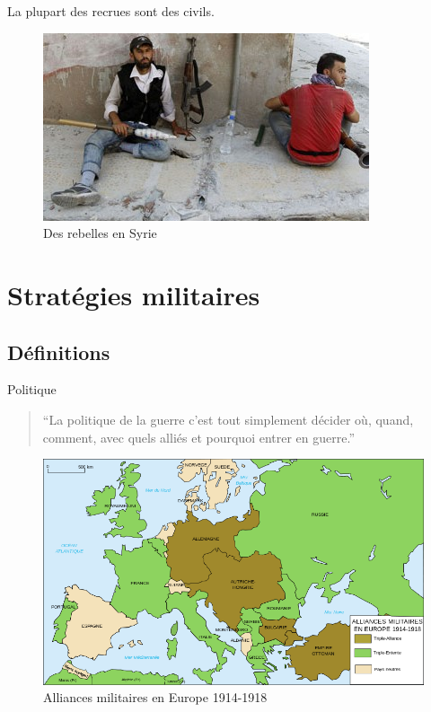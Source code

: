 \documentclass{article}
\begin{document}
La plupart des recrues sont des civils.
\begin{figure}[H]
	\begin{centering}
	\includegraphics[]{../ressources/rebel_syrie}
	\caption{Des rebelles en Syrie \cite{rebel_syrie}}
	\end{centering}
\end{figure}


\section{Stratégies militaires}

\subsection{Définitions}
Politique \cite{politique_jomini}
\begin{quote}“La politique de la guerre c’est tout simplement décider où, quand, comment, avec quels alliés et pourquoi entrer en guerre.”\end{quote}
\begin{figure}[H]
	\begin{centering}
	\includegraphics[width=0.95\linewidth]{../ressources/alliances_ww1}
	\caption{Alliances militaires en Europe 1914-1918 \cite{ww1}}
	\end{centering}
\end{figure}
\end{document}
